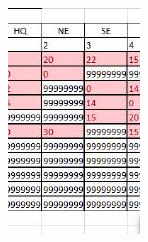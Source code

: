 \documentclass[10pt]{article}
\begin{document}
\includegraphics[max width=\textwidth]{2022_07_05_5945264bba2a5f6ba667g-58(3)}\\
\end{document}
